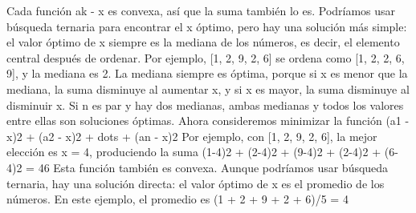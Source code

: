 {}Cada función \markdownRendererDollarSign{}\markdownRendererPipe{}a\markdownRendererUnderscore{}k - x\markdownRendererPipe{}\markdownRendererDollarSign{} es convexa, así que la suma también lo es. Podríamos usar búsqueda ternaria para encontrar el \markdownRendererDollarSign{}x\markdownRendererDollarSign{} óptimo, pero hay una solución más simple: el valor óptimo de \markdownRendererDollarSign{}x\markdownRendererDollarSign{} siempre es la mediana de los números, es decir, el elemento central después de ordenar. Por ejemplo, [1, 2, 9, 2, 6] se ordena como [1, 2, 2, 6, 9], y la mediana es 2.\markdownRendererParagraphSeparator
{}La mediana siempre es óptima, porque si \markdownRendererDollarSign{}x\markdownRendererDollarSign{} es menor que la mediana, la suma disminuye al aumentar \markdownRendererDollarSign{}x\markdownRendererDollarSign{}, y si \markdownRendererDollarSign{}x\markdownRendererDollarSign{} es mayor, la suma disminuye al disminuir \markdownRendererDollarSign{}x\markdownRendererDollarSign{}. Si \markdownRendererDollarSign{}n\markdownRendererDollarSign{} es par y hay dos medianas, ambas medianas y todos los valores entre ellas son soluciones óptimas.\markdownRendererParagraphSeparator
{}Ahora consideremos minimizar la función\markdownRendererParagraphSeparator
{}\markdownRendererDollarSign{}\markdownRendererDollarSign{}(a\markdownRendererUnderscore{}1 - x)\markdownRendererCircumflex{}2 + (a\markdownRendererUnderscore{}2 - x)\markdownRendererCircumflex{}2 + \markdownRendererBackslash{}dots + (a\markdownRendererUnderscore{}n - x)\markdownRendererCircumflex{}2\markdownRendererDollarSign{}\markdownRendererDollarSign{}\markdownRendererParagraphSeparator
{}Por ejemplo, con [1, 2, 9, 2, 6], la mejor elección es \markdownRendererDollarSign{}x = 4\markdownRendererDollarSign{}, produciendo la suma\markdownRendererParagraphSeparator
{}\markdownRendererDollarSign{}\markdownRendererDollarSign{}(1-4)\markdownRendererCircumflex{}2 + (2-4)\markdownRendererCircumflex{}2 + (9-4)\markdownRendererCircumflex{}2 + (2-4)\markdownRendererCircumflex{}2 + (6-4)\markdownRendererCircumflex{}2 = 46\markdownRendererDollarSign{}\markdownRendererDollarSign{}\markdownRendererParagraphSeparator
{}Esta función también es convexa. Aunque podríamos usar búsqueda ternaria, hay una solución directa: el valor óptimo de \markdownRendererDollarSign{}x\markdownRendererDollarSign{} es el promedio de los números. En este ejemplo, el promedio es\markdownRendererParagraphSeparator
{}\markdownRendererDollarSign{}\markdownRendererDollarSign{}(1 + 2 + 9 + 2 + 6)/5 = 4\markdownRendererDollarSign{}\markdownRendererDollarSign{}\markdownRendererParagraphSeparator
